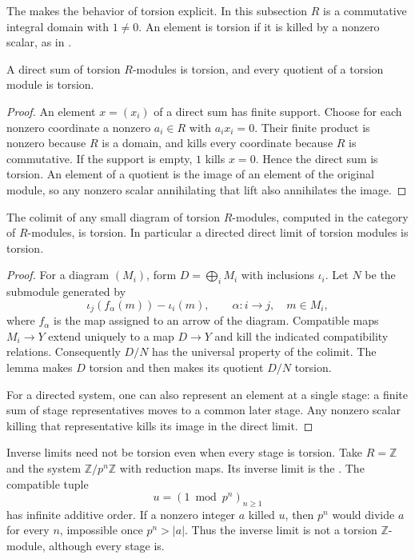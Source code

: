 The  makes the behavior of torsion explicit. In this subsection $R$ is a commutative integral domain with $1\ne0$. An element is torsion if it is killed by a nonzero scalar, as in .

\begin{lemma}\label{lem-torsion-sums-quotients}
A direct sum of torsion $R$-modules is torsion, and every quotient of a torsion module is torsion.
\end{lemma}
\begin{proof}\label{proof-torsion-sums-quotients}
An element $x=(x_i)$ of a direct sum has finite support. Choose for each nonzero coordinate a nonzero $a_i\in R$ with $a_ix_i=0$. Their finite product is nonzero because $R$ is a domain, and kills every coordinate because $R$ is commutative. If the support is empty, $1$ kills $x=0$. Hence the direct sum is torsion. An element of a quotient is the image of an element of the original module, so any nonzero scalar annihilating that lift also annihilates the image.
\end{proof}

\begin{proposition}\label{prop-torsion-colimits}
The colimit of any small diagram of torsion $R$-modules, computed in the category of $R$-modules, is torsion. In particular a directed direct limit of torsion modules is torsion.
\end{proposition}
\begin{proof}\label{proof-torsion-colimits}
For a diagram $(M_i)$, form $D=\bigoplus_iM_i$ with inclusions $\iota_i$. Let $N$ be the submodule generated by
\[
\iota_j(f_\alpha(m))-\iota_i(m),
\qquad \alpha:i\to j,\quad m\in M_i,
\]
where $f_\alpha$ is the map assigned to an arrow of the diagram. Compatible maps $M_i\to Y$ extend uniquely to a map $D\to Y$ and kill the indicated compatibility relations. Consequently $D/N$ has the universal property of the colimit. The lemma makes $D$ torsion and then makes its quotient $D/N$ torsion.

For a directed system, one can also represent an element at a single stage: a finite sum of stage representatives moves to a common later stage. Any nonzero scalar killing that representative kills its image in the direct limit.
\end{proof}

\begin{example}\label{ex-inverse-limit-torsion-failure}
Inverse limits need not be torsion even when every stage is torsion. Take $R=\mathbb Z$ and the system $\mathbb Z/p^n\mathbb Z$ with reduction maps. Its inverse limit is the . The compatible tuple
\[
u=(1\bmod p^n)_{n\ge1}
\]
has infinite additive order. If a nonzero integer $a$ killed $u$, then $p^n$ would divide $a$ for every $n$, impossible once $p^n>|a|$. Thus the inverse limit is not a torsion $\mathbb Z$-module, although every stage is.
\end{example}

